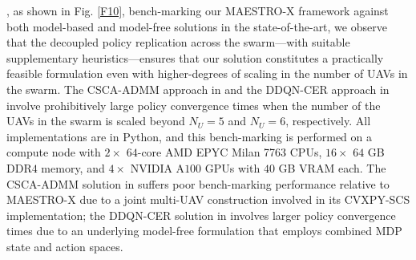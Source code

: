 \documentclass[10pt, twocolumn]{IEEEtran}
\theoremstyle{plain}
\theoremstyle{definition}
\theoremstyle{remark}
\begin{document}
, as shown in Fig. \ref{F10}, bench-marking our MAESTRO-X framework against both model-based \cite{CSCA-ADMM} and model-free \cite{DDQN} solutions in the state-of-the-art, we observe that the decoupled policy replication across the swarm---with suitable supplementary heuristics---ensures that our solution constitutes a practically feasible formulation even with higher-degrees of scaling in the number of UAVs in the swarm. The CSCA-ADMM approach in \cite{CSCA-ADMM} and the DDQN-CER approach in \cite{DDQN} involve prohibitively large policy convergence times when the number of the UAVs in the swarm is scaled beyond $N_{U}{=}5$ and $N_{U}{=}6$, respectively. All implementations are in Python, and this bench-marking is performed on a compute node with $2{\times}$ $64$-core AMD EPYC Milan 7763 CPUs, $16{\times}$ $64$ GB DDR$4$ memory, and $4{\times}$ NVIDIA A$100$ GPUs with $40$ GB VRAM each. The CSCA-ADMM solution in \cite{CSCA-ADMM} suffers poor bench-marking performance relative to MAESTRO-X due to a joint multi-UAV construction involved in its CVXPY-SCS implementation; the DDQN-CER solution in \cite{DDQN} involves larger policy convergence times due to an underlying model-free formulation that employs combined MDP state and action spaces.
\end{document}
